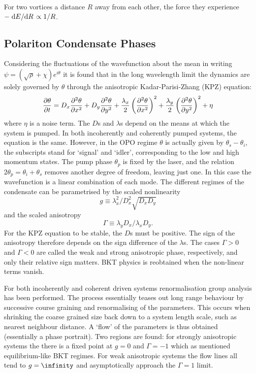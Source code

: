\documentclass[letterpaper, 10 pt, conference]{IEEEtran}  %
\begin{document}
For two vortices a distance $R$ away from each other, the force they experience $-\dv*{E}{R} \propto 1/R$. 

\subsection{Polariton Condensate Phases}

Considering the fluctuations of the wavefunction about the mean in writing $\psi = (\sqrt{\rho} + \chi)e^{i \theta}$ it is found that in the long wavelength limit the dynamics are solely governed by $\theta$ through the anisotropic Kadar-Parisi-Zhang (KPZ) equation:
\[
\pdv{\theta}{t} = D_x \pdv[2]{\theta}{x} + D_y \pdv[2]{\theta}{y} + \frac{\lambda_x}{2}\left ( \pdv[2]{\theta}{x} \right)^2 + \frac{\lambda_y}{2} \left (\pdv[2]{\theta}{y} \right)^2 + \eta
\]
where $\eta$ is a noise term. 
The $D$s and $\lambda$s depend on the means at which the system is pumped. 
In both incoherently and coherently pumped systems, the equation is the same. 
However, in the OPO regime $\theta$ is actually given by $\theta_s - \theta_i$, the subscripts stand for `signal' and `idler', corresponding to the low and high momentum states.
The pump phase $\theta_p$ is fixed by the laser, and the relation $2 \theta_p = \theta_i + \theta_s$ removes another degree of freedom, leaving just one.  
In this case the wavefunction is a linear combination of each mode.
The different regimes of the condensate can be parametrised by the scaled nonlinearity 
\[
g \equiv \lambda_x^2/D_x^2\sqrt{D_x D_y}
\]
and the scaled anisotropy 
\[
\Gamma \equiv \lambda_y D_x / \lambda_x D_y.
\] 
For the KPZ equation to be stable, the $D$s must be positive.
The sign of the anisotropy therefore depends on the sign difference of the $\lambda$s. 
The cases $\Gamma > 0$ and $\Gamma < 0$ are called the weak and strong anisotropic phase, respectively, and only their relative sign matters.
BKT physics is reobtained when the non-linear terms vanish.

For both incoherently and coherent driven systems renormalisation group analysis has been performed.
The process essentially teases out long range behaviour by successive course graining and renormalising of the parameters. 
This occurs when shrinking the coarse grained size back down to a system length scale, such as nearest neighbour distance.
A `flow' of the parameters is thus obtained (essentially a phase portrait).
Two regions are found: for strongly anisotropic systems the there is a fixed point at $g=0$ and $\Gamma = -1$ which as mentioned equilibrium-like BKT regimes. 
For weak anisotropic systems the flow lines all tend to $g= \infinity$ and asymptotically approach the $\Gamma =1$ limit. 

  
 

 
\end{document}
